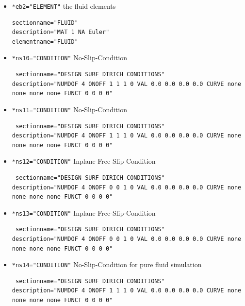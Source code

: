 \begin{itemize}
 \item \verb|*eb2="ELEMENT"| \qquad the fluid elements
 \begin{small} \begin{verbatim}
sectionname="FLUID"
description="MAT 1 NA Euler"
elementname="FLUID"
\end{verbatim} \end{small}


 \item \verb|*ns10="CONDITION"| \qquad No-Slip-Condition
\begin{small} \begin{verbatim} sectionname="DESIGN SURF DIRICH CONDITIONS"
description="NUMDOF 4 ONOFF 1 1 1 0 VAL 0.0 0.0 0.0 0.0 CURVE none none none none FUNCT 0 0 0 0"
\end{verbatim} \end{small}

 \item \verb|*ns11="CONDITION"| \qquad No-Slip-Condition
\begin{small} \begin{verbatim} sectionname="DESIGN SURF DIRICH CONDITIONS"
description="NUMDOF 4 ONOFF 1 1 1 0 VAL 0.0 0.0 0.0 0.0 CURVE none none none none FUNCT 0 0 0 0"
\end{verbatim} \end{small}

 \item \verb|*ns12="CONDITION"| \qquad Inplane Free-Slip-Condition
\begin{small} \begin{verbatim} sectionname="DESIGN SURF DIRICH CONDITIONS"
description="NUMDOF 4 ONOFF 0 0 1 0 VAL 0.0 0.0 0.0 0.0 CURVE none none none none FUNCT 0 0 0 0"
\end{verbatim} \end{small}

 \item \verb|*ns13="CONDITION"| \qquad Inplane Free-Slip-Condition
\begin{small} \begin{verbatim} sectionname="DESIGN SURF DIRICH CONDITIONS"
description="NUMDOF 4 ONOFF 0 0 1 0 VAL 0.0 0.0 0.0 0.0 CURVE none none none none FUNCT 0 0 0 0"
\end{verbatim} \end{small}

 \item \verb|*ns14="CONDITION"| \qquad No-Slip-Condition for pure fluid simulation
\begin{small} \begin{verbatim} sectionname="DESIGN SURF DIRICH CONDITIONS"
description="NUMDOF 4 ONOFF 1 1 1 0 VAL 0.0 0.0 0.0 0.0 CURVE none none none none FUNCT 0 0 0 0"
\end{verbatim} \end{small}


\end{itemize}
